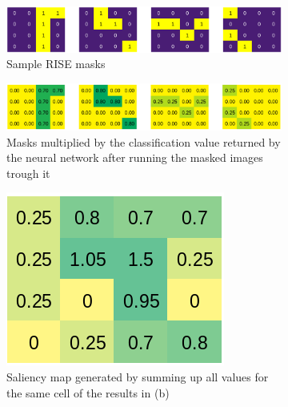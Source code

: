 \begin{figure}[H]
    \centering
    \begin{subfigure}[t]{\textwidth}
        \centering
        \includegraphics[width=\linewidth]{chapters/02_methods/images/rise/explain_rise_masks.png}
        \caption{Sample RISE masks}
    \end{subfigure}
    \begin{subfigure}[t]{\textwidth}
        \centering
        \includegraphics[width=\linewidth]{chapters/02_methods/images/rise/explain_rise_result.png}
        \caption{Masks multiplied by the classification value returned by the neural network after running the masked images trough it}
    \end{subfigure}\hfill
    \begin{subfigure}[t]{.5\textwidth}
        \centering
        \includegraphics[width=\linewidth]{chapters/02_methods/images/rise/explain_rise_saliency.png}
        \caption{Saliency map generated by summing up all values for the same cell of the results in (b)}
    \end{subfigure}
    \caption{}
    \label{rise_explanation}
\end{figure}

